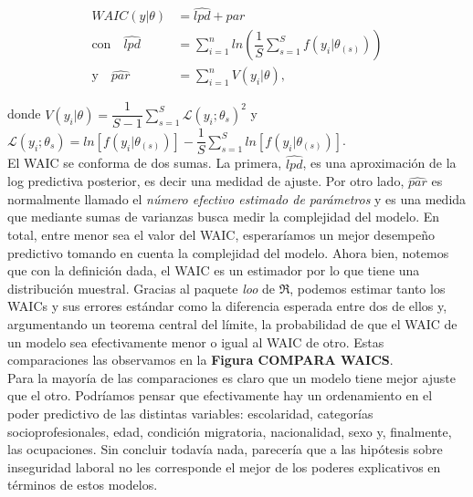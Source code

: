 \begin{align}\label{WAIC}
WAIC(y|\theta) &= \widehat{lpd} + \widehat{par} \\
\text{con} \quad \widehat{lpd} &= \sum_{i=1}^{n} ln\left(\dfrac{1}{S}\sum\limits_{s=1}^S f(y_i|\theta_{(s)}) \right) \nonumber \\
\text{y} \quad \widehat{par} &= \sum\limits_{i=1}^n V(y_i|\theta), \nonumber
\end{align}

donde $V(y_i|\theta)=\dfrac{1}{S-1}\sum\limits_{s=1}^S \mathcal{L}(y_i;\theta_{s})^2$ y $\mathcal{L}(y_i;\theta_{s}) = ln\left[f(y_i|\theta_{(s)})\right] - \dfrac{1}{S}\sum\limits_{s=1}^S ln\left[f(y_i|\theta_{(s)})\right]$.\\
El WAIC se conforma de dos sumas. La primera, $\widehat{lpd}$, es una aproximación de la log predictiva posterior, es decir una medidad de ajuste. Por otro lado, $\widehat{par}$ es normalmente llamado el \textit{número efectivo estimado de parámetros} y es una medida que mediante sumas de varianzas busca medir la complejidad del modelo. En total, entre menor sea el valor del WAIC, esperaríamos un mejor desempeño predictivo tomando en cuenta la complejidad del modelo. Ahora bien, notemos que con la definición dada, el WAIC es un estimador por lo que tiene una distribución muestral. Gracias al paquete \textit{loo} de $\mathfrak{R}$, podemos estimar tanto los WAICs y sus errores estándar como la diferencia esperada entre dos de ellos y, argumentando un teorema central del límite, la probabilidad de que el WAIC de un modelo sea efectivamente menor o igual al WAIC de otro. Estas comparaciones las observamos en la \textbf{Figura COMPARA WAICS}.\\

Para la mayoría de las comparaciones es claro que un modelo tiene mejor ajuste que el otro. Podríamos pensar que efectivamente hay un ordenamiento en el poder predictivo de las distintas variables: escolaridad, categorías socioprofesionales, edad, condición migratoria, nacionalidad, sexo y, finalmente, las ocupaciones. Sin concluir todavía nada, parecería que a las hipótesis sobre inseguridad laboral no les corresponde el mejor de los poderes explicativos en términos de estos modelos. 

